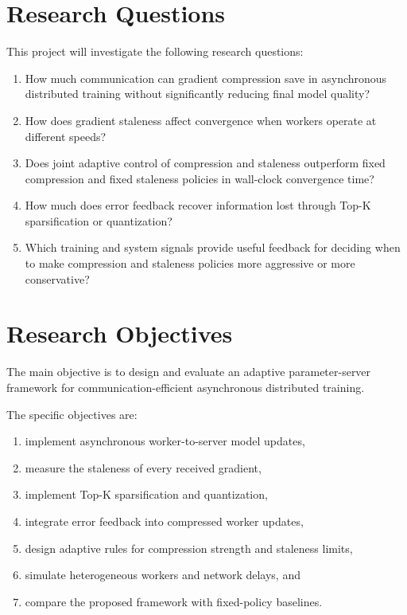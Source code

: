 \documentclass[conference]{IEEEtran}
\begin{document}
\section{Research Questions}

This project will investigate the following research questions:

\begin{enumerate}
    \item How much communication can gradient compression save in asynchronous distributed training without significantly reducing final model quality?
    \item How does gradient staleness affect convergence when workers operate at different speeds?
    \item Does joint adaptive control of compression and staleness outperform fixed compression and fixed staleness policies in wall-clock convergence time?
    \item How much does error feedback recover information lost through Top-K sparsification or quantization?
    \item Which training and system signals provide useful feedback for deciding when to make compression and staleness policies more aggressive or more conservative?
\end{enumerate}

\section{Research Objectives}

The main objective is to design and evaluate an adaptive parameter-server framework for communication-efficient asynchronous distributed training.

The specific objectives are:
\begin{enumerate}
    \item implement asynchronous worker-to-server model updates,
    \item measure the staleness of every received gradient,
    \item implement Top-K sparsification and quantization,
    \item integrate error feedback into compressed worker updates,
    \item design adaptive rules for compression strength and staleness limits,
    \item simulate heterogeneous workers and network delays, and
    \item compare the proposed framework with fixed-policy baselines.
\end{enumerate}
\end{document}
